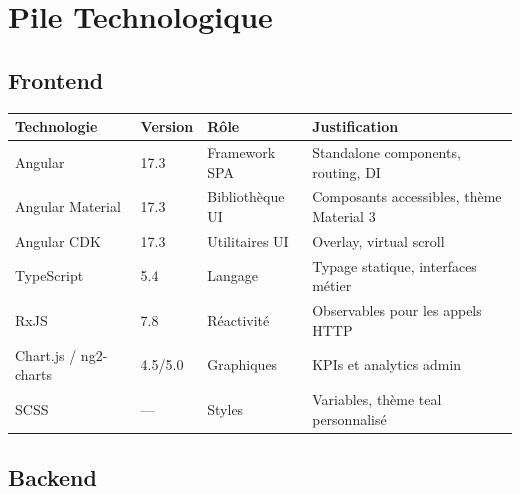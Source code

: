\documentclass[12pt,a4paper]{report}
\begin{document}
\chapter{Pile Technologique}

\section{Frontend}

\begin{center}
\small
\begin{tabular}{@{} l l l p{6cm} @{}}
  \toprule
  \textbf{Technologie} & \textbf{Version} & \textbf{Rôle} & \textbf{Justification} \\
  \midrule
  Angular              & 17.3  & Framework SPA     & Standalone components, routing, DI \\
  Angular Material     & 17.3  & Bibliothèque UI   & Composants accessibles, thème Material 3 \\
  Angular CDK          & 17.3  & Utilitaires UI    & Overlay, virtual scroll \\
  TypeScript           & 5.4   & Langage           & Typage statique, interfaces métier \\
  RxJS                 & 7.8   & Réactivité        & Observables pour les appels HTTP \\
  Chart.js / ng2-charts& 4.5/5.0 & Graphiques      & KPIs et analytics admin \\
  SCSS                 & —     & Styles            & Variables, thème teal personnalisé \\
  \bottomrule
\end{tabular}
\end{center}

\section{Backend}
\end{document}
